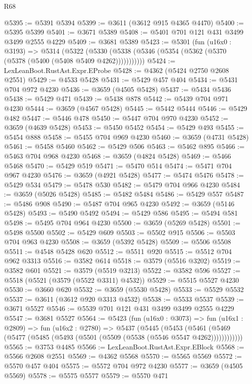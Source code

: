 \begin{lexlean}{R68}
\begin{coremodule}
@5395 := @5391 @5394
@5399 := @3611 (@3612 @915 @4365 @4470)
@5400 := @5395 @5399
@5401 := @3671 @5389
@5408 := @5401 @701 @121 @431 @3499 @3499 @2555 @4229
@5409 := @3681 @5389
@5423 := @5301
    (fun (u16x0 : @3193) =>
    @5314
      (@5322 (@5330 (@5338 (@5346 (@5354 (@5362 (@5370 (@5378 (@5400 (@5408 @5409 @4262)))))))))))
@5424 := LexLeanBoot.RustAst.Expr.EProbe
@5428 := @4362 (@5424 @2750 @2608 @2551)
@5429 := @4533 @5428
@5431 := @5429 @457 @404
@5434 := @5431 @704 @972 @4230
@5436 := @3659 (@4505 @5428)
@5437 := @5434 @5436
@5438 := @5429 @471
@5439 := @5438 @878
@5442 := @5439 @704 @971 @4230
@5444 := @3659 (@4567 @5428)
@5445 := @5442 @5444
@5446 := @5429 @482
@5447 := @5446 @478
@5450 := @5447 @704 @970 @4230
@5452 := @3659 (@4639 @5428)
@5453 := @5450 @5452
@5454 := @5429 @493
@5455 := @5454 @888
@5458 := @5455 @704 @969 @4230
@5460 := @3659 (@4731 @5428)
@5461 := @5458 @5460
@5462 := @5429 @506
@5463 := @5462 @895
@5466 := @5463 @704 @968 @4230
@5468 := @3659 (@4824 @5428)
@5469 := @5466 @5468
@5470 := @5429 @519
@5471 := @5470 @514
@5474 := @5471 @704 @967 @4230
@5476 := @3659 (@4921 @5428)
@5477 := @5474 @5476
@5478 := @5429 @534
@5479 := @5478 @530
@5482 := @5479 @704 @966 @4230
@5484 := @3659 (@5026 @5428)
@5485 := @5482 @5484
@5486 := @5429 @557
@5487 := @5486 @908
@5490 := @5487 @704 @965 @4230
@5492 := @3659 (@5146 @5428)
@5493 := @5490 @5492
@5494 := @5429 @586
@5495 := @5494 @581
@5498 := @5495 @704 @964 @4230
@5500 := @3659 (@5269 @5428)
@5501 := @5498 @5500
@5502 := @5429 @609
@5503 := @5502 @915
@5506 := @5503 @704 @963 @4230
@5508 := @3659 (@5392 @5428)
@5509 := @5506 @5508
@5511 := @4548 @5428 @620
@5512 := @5511 @920
@5515 := @5512 @704 @962 @3313
@5516 := @3582 @614
@5518 := @3579 (@5516 @3202)
@5519 := @3582 @601
@5521 := @3579 (@5519 @3213)
@5522 := @3582 @596
@5527 := @5518 (@5521 (@3579 (@5522 @3311) @4532))
@5529 := @5515 @5527 @4230
@5530 := @3660 @620
@5532 := @3659 (@5530 @5428)
@5533 := @5529 @5532
@5537 := @3611 (@3612 @920 @3313 @4532)
@5538 := @5533 @5537
@5539 := @3671 @5527
@5546 := @5539 @701 @121 @431 @3499 @3499 @2555 @4229
@5547 := @3681 @5527
@5564 := @5423
    (fun (u16x0 : @3073) =>
    fun (u16x1 : @2809) =>
    fun (u16x2 : @2780) =>
    @5437
      (@5445
        (@5453
          (@5461 (@5469 (@5477 (@5485 (@5493 (@5501 (@5509 (@5538 (@5546 @5547 @4262))))))))))))
@5565 := @3753 @4485
@5566 := LexLeanBoot.RustAst.Expr.EBlock
@5568 := @5566 @2608 @2551
@5569 := @4362 @5568
@5570 := @5565 @5569
@5572 := @5570 @457 @404
@5575 := @5572 @704 @972 @4230
@5577 := @3659 (@4505 @5569)
@5578 := @5575 @5577
@5579 := @5570 @471

\end{coremodule}
\end{lexlean}
